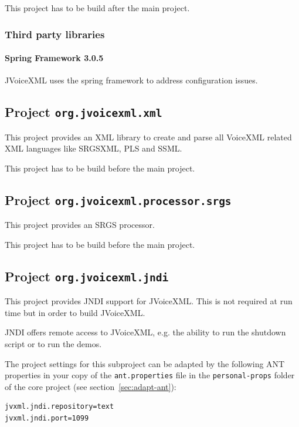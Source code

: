 \documentclass[11pt,a4paper]{article}
\begin{document}
This project has to be build after the main project.

\subsubsection{Third party libraries}
\label{sec:config-third-party-libr}

\paragraph{Spring Framework 3.0.5}
\label{sec:spring-framework}

JVoiceXML uses the spring framework to address configuration issues.

\subsection{Project \texttt{org.jvoicexml.xml}}
\label{sec:org.jvoicexml.xml}

This project provides an XML library to create and parse all VoiceXML related
XML languages like SRGSXML, PLS and SSML.

This project has to be build before the main project.

\subsection{Project \texttt{org.jvoicexml.processor.srgs}}
\label{sec:org.jvoicexml.processor.srgs}

This project provides an SRGS processor.

This project has to be build before the main project.

\subsection{Project \texttt{org.jvoicexml.jndi}}

This project provides JNDI support for JVoiceXML. This is not required at run
time but in order to build JVoiceXML.

JNDI offers remote access to JVoiceXML, e.g. the ability to run the
shutdown script or to run the demos.

The project settings for this subproject can be adapted by the following ANT
properties in your copy of the \texttt{ant.properties} file in the
\texttt{personal-props} folder of the core project (see 
section~\ref{sec:adapt-ant}):
\begin{lstlisting}
jvxml.jndi.repository=text
jvxml.jndi.port=1099
\end{lstlisting}
\end{document}
